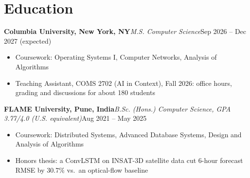 
\renewcommand{\normalsize}{\fontsize{10}{12}\selectfont}
\titlespacing{\section}{0pt}{6pt}{2.5pt}
\newcommand{\role}[3]{\par\vspace{2pt}\textbf{#1}\enspace\textperiodcentered\enspace\textit{#2}\hfill #3\par}
\newcommand{\proj}[3]{\par\vspace{2pt}\textbf{#1}\enspace\textperiodcentered\enspace\textit{#2}\hfill #3\par}
\newcommand{\skill}[2]{\par\hangindent=1.1em\hangafter=1\textbf{#1:} #2\par}

\normalsize
{}
\section{Education}
\role{Columbia University, New York, NY}{M.S. Computer Science}{Sep 2026 -- Dec 2027 (expected)}
\begin{itemize}
  \item Coursework: Operating Systems I, Computer Networks, Analysis of Algorithms
  \item Teaching Assistant, COMS 2702 (AI in Context), Fall 2026: office hours, grading and discussions for about 180 students
\end{itemize}
\role{FLAME University, Pune, India}{B.Sc. (Hons.) Computer Science, GPA 3.77/4.0 (U.S. equivalent)}{Aug 2021 -- May 2025}
\begin{itemize}
  \item Coursework: Distributed Systems, Advanced Database Systems, Design and Analysis of Algorithms
  \item Honors thesis: a ConvLSTM on INSAT-3D satellite data cut 6-hour forecast RMSE by 30.7\% vs.\ an optical-flow baseline
\end{itemize}
